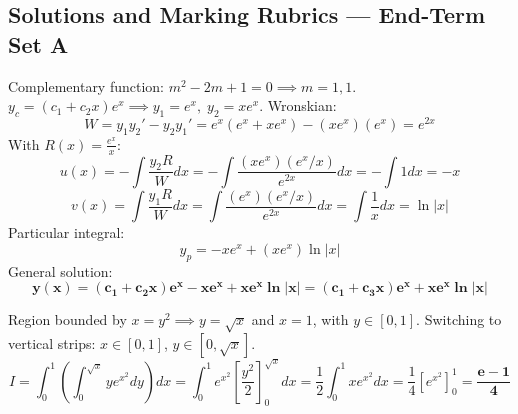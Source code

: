 

\newpage
\subsection*{Solutions and Marking Rubrics --- End-Term Set A}

\begin{solutionbox}
Complementary function: $m^2 - 2m + 1 = 0 \implies m = 1, 1$.
$y_c = (c_1 + c_2 x)e^x \implies y_1 = e^x, \; y_2 = x e^x$.
Wronskian:
\[
W = y_1 y_2' - y_2 y_1' = e^x(e^x + x e^x) - (x e^x)(e^x) = e^{2x}
\]
With $R(x) = \frac{e^x}{x}$:
\[
u(x) = -\int \frac{y_2 R}{W} dx = -\int \frac{(x e^x)(e^x/x)}{e^{2x}} dx = -\int 1 dx = -x
\]
\[
v(x) = \int \frac{y_1 R}{W} dx = \int \frac{(e^x)(e^x/x)}{e^{2x}} dx = \int \frac{1}{x} dx = \ln|x|
\]
Particular integral:
\[
y_p = -x e^x + (x e^x)\ln|x|
\]
General solution:
\[
\mathbf{y(x) = (c_1 + c_2 x)e^x - x e^x + x e^x \ln|x| = (c_1 + c_3 x)e^x + x e^x \ln|x|}
\]
\end{solutionbox}

\begin{solutionbox}
Region bounded by $x = y^2 \implies y = \sqrt{x}$ and $x = 1$, with $y \in [0, 1]$.
Switching to vertical strips: $x \in [0, 1]$, $y \in [0, \sqrt{x}]$.
\[
I = \int_0^1 \left( \int_0^{\sqrt{x}} y e^{x^2} dy \right) dx = \int_0^1 e^{x^2} \left[ \frac{y^2}{2} \right]_0^{\sqrt{x}} dx = \frac{1}{2}\int_0^1 x e^{x^2} dx = \frac{1}{4}[e^{x^2}]_0^1 = \mathbf{\frac{e - 1}{4}}
\]
\end{solutionbox}

\newpage
